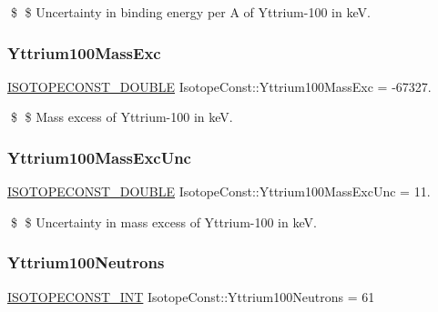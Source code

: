 \$ \$ Uncertainty in binding energy per A of Yttrium-\/100 in keV. \mbox{\label{group___isotope_const-_yttrium-_y100_gad18e06f1b2f7f02c685fe1c69b322b91}} 
\subsubsection{\texorpdfstring{Yttrium100\+Mass\+Exc}{Yttrium100MassExc}}
{\footnotesize\ttfamily \mbox{\hyperlink{group___isotope_const-_macros_ga8f45a7272ce02c0b4c65c44636ed719a}{I\+S\+O\+T\+O\+P\+E\+C\+O\+N\+S\+T\+\_\+\+D\+O\+U\+B\+LE}} Isotope\+Const\+::\+Yttrium100\+Mass\+Exc = -\/67327.}

\$ \$ Mass excess of Yttrium-\/100 in keV. \mbox{\label{group___isotope_const-_yttrium-_y100_ga5ee14d018c339987daf79589b95e53bc}} 
\subsubsection{\texorpdfstring{Yttrium100\+Mass\+Exc\+Unc}{Yttrium100MassExcUnc}}
{\footnotesize\ttfamily \mbox{\hyperlink{group___isotope_const-_macros_ga8f45a7272ce02c0b4c65c44636ed719a}{I\+S\+O\+T\+O\+P\+E\+C\+O\+N\+S\+T\+\_\+\+D\+O\+U\+B\+LE}} Isotope\+Const\+::\+Yttrium100\+Mass\+Exc\+Unc = 11.}

\$ \$ Uncertainty in mass excess of Yttrium-\/100 in keV. \mbox{\label{group___isotope_const-_yttrium-_y100_gab26208164dc7413ca570878b73aecf7d}} 
\subsubsection{\texorpdfstring{Yttrium100\+Neutrons}{Yttrium100Neutrons}}
{\footnotesize\ttfamily \mbox{\hyperlink{group___isotope_const-_macros_ga5f18360b3e99483a35c32d789e62621c}{I\+S\+O\+T\+O\+P\+E\+C\+O\+N\+S\+T\+\_\+\+I\+NT}} Isotope\+Const\+::\+Yttrium100\+Neutrons = 61}

